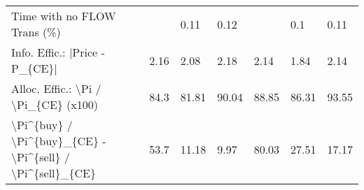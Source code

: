 \begin{tabular}{lllllll}
 Time with no FLOW Trans (\%)                               &          & 0.11     & 0.12     &           & 0.1       & 0.11      \\
 Info. Effic.: |Price - P\_\{CE\}|                            & 2.16     & 2.08     & 2.18     & 2.14      & 1.84      & 2.14      \\
 Alloc. Effic.: \textbackslash{}Pi / \textbackslash{}Pi\_\{CE\} (x100)                      & 84.3     & 81.81    & 90.04    & 88.85     & 86.31     & 93.55     \\
 \textbackslash{}Pi\^{}\{buy\} / \textbackslash{}Pi\^{}\{buy\}\_\{CE\} - \textbackslash{}Pi\^{}\{sell\} / \textbackslash{}Pi\^{}\{sell\}\_\{CE\} & 53.7     & 11.18    & 9.97     & 80.03     & 27.51     & 17.17     \\
\hline
\end{tabular}